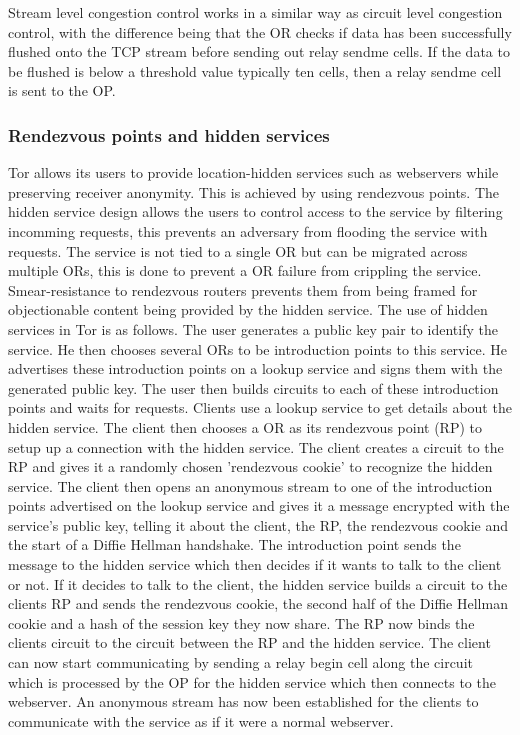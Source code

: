 \documentclass{llncs}
\begin{document}
Stream level congestion control works in a similar way as circuit level congestion control, with the difference being that the OR checks if data has been successfully flushed onto the TCP stream before sending out relay sendme cells. If the data to be flushed is below a threshold value typically ten cells, then a relay sendme cell is sent to the OP.

\subsubsection{Rendezvous points and hidden services}
Tor allows its users to provide location-hidden services such as webservers while preserving receiver anonymity. This is achieved by using rendezvous points. The hidden service design allows the users to control access to the service by filtering incomming requests, this prevents an adversary from flooding the service with requests. The service is not tied to a single OR but can be migrated across multiple ORs, this is done to prevent a OR failure from crippling the service. Smear-resistance to rendezvous routers prevents them from being framed for objectionable content being provided by the hidden service.
The use of hidden services in Tor is as follows. The user generates a public key pair to identify the service. He then chooses several ORs to be introduction points to this service. He advertises these introduction points on a lookup service and signs them with the generated public key. The user then builds circuits to each of these introduction points and waits for requests.
Clients use a lookup service to get details about the hidden service. The client then chooses a OR as its rendezvous point (RP) to setup up a connection with the hidden service. The client creates a circuit to the RP and gives it a randomly chosen 'rendezvous cookie' to recognize the hidden service. The client then opens an anonymous stream to one of the introduction points advertised on the lookup service and gives it a message encrypted with the service's public key, telling it about the client, the RP, the rendezvous cookie and the start of a Diffie Hellman handshake. The introduction point sends the message to the hidden service which then decides if it wants to talk to the client or not.
If it decides to talk to the client, the hidden service builds a circuit to the clients RP and sends the rendezvous cookie, the second half of the Diffie Hellman cookie and a hash of the session key they now share. The RP now binds the clients circuit  to the circuit between the RP and the hidden service. The client can now start communicating by sending a relay begin cell along the circuit which is processed by the OP for the hidden service which then connects to the webserver. An anonymous stream has now been established for the clients to communicate with the service as if it were a normal webserver.
\end{document}
